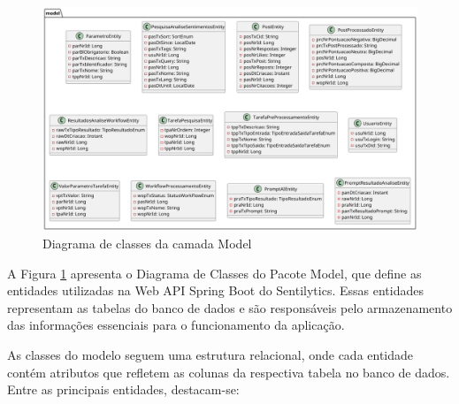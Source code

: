 \documentclass[
	12pt,				%
	oneside,			%
	a4paper,			%
	english,			%
	french,				%
	spanish,			%
	brazil				%
	]{abntex2}
\begin{document}
\begin{figure}[htbp]
\hypertarget{diagrama_classe_model}{%
\caption{Diagrama de classes da camada Model}\label{diagrama_classe_model}
\begin{center}
\includegraphics[scale=0.3]{imagens/sentilytics/diagramas/classes/model-classes.png}
\end{center}
}
\end{figure}

A Figura \ref{diagrama_classe_model} apresenta o Diagrama de Classes do
Pacote Model, que define as entidades utilizadas na Web API Spring Boot
do Sentilytics. Essas entidades representam as tabelas do banco de dados
e são responsáveis pelo armazenamento das informações essenciais para o
funcionamento da aplicação.

As classes do modelo seguem uma estrutura relacional, onde cada entidade
contém atributos que refletem as colunas da respectiva tabela no banco
de dados. Entre as principais entidades, destacam-se:
\end{document}

